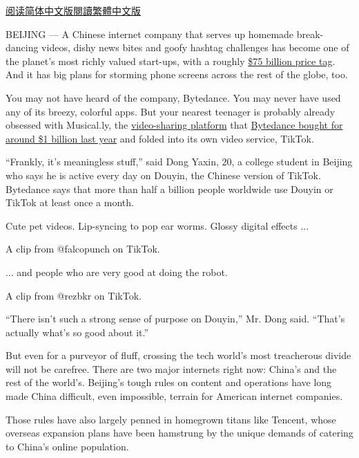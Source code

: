 \href{https://cn.nytimes.com/technology/20181030/bytedance-app-funding-china/}{阅读简体中文版}\href{https://cn.nytimes.com/technology/20181030/bytedance-app-funding-china/zh-hant/}{閱讀繁體中文版}

BEIJING --- A Chinese internet company that serves up homemade
break-dancing videos, dishy news bites and goofy hashtag challenges has
become one of the planet's most richly valued start-ups, with a roughly
\href{https://www.nytimes.com/2018/09/28/technology/bytedance-fundraising-toutiao-tiktok.html}{\$75
billion price tag}. And it has big plans for storming phone screens
across the rest of the globe, too.

You may not have heard of the company, Bytedance. You may never have
used any of its breezy, colorful apps. But your nearest teenager is
probably already obsessed with Musical.ly, the
\href{https://www.nytimes.com/2016/08/10/technology/china-homegrown-internet-companies-rest-of-the-world.html}{video-sharing
platform} that
\href{https://www.nytimes.com/2017/11/10/business/dealbook/musically-sold-app-video.html}{Bytedance
bought for around \$1 billion last year} and folded into its own video
service, TikTok.

``Frankly, it's meaningless stuff,'' said Dong Yaxin, 20, a college
student in Beijing who says he is active every day on Douyin, the
Chinese version of TikTok. Bytedance says that more than half a billion
people worldwide use Douyin or TikTok at least once a month.

Cute pet videos. Lip-syncing to pop ear worms. Glossy digital effects
...

A clip from @falcopunch on TikTok.

... and people who are very good at doing the robot.

A clip from @rezbkr on TikTok.

``There isn't such a strong sense of purpose on Douyin,'' Mr. Dong said.
``That's actually what's so good about it.''

But even for a purveyor of fluff, crossing the tech world's most
treacherous divide will not be carefree. There are two major internets
right now: China's and the rest of the world's. Beijing's tough rules on
content and operations have long made China difficult, even impossible,
terrain for American internet companies.

Those rules have also largely penned in homegrown titans like Tencent,
whose overseas expansion plans have been hamstrung by the unique demands
of catering to China's online population.

